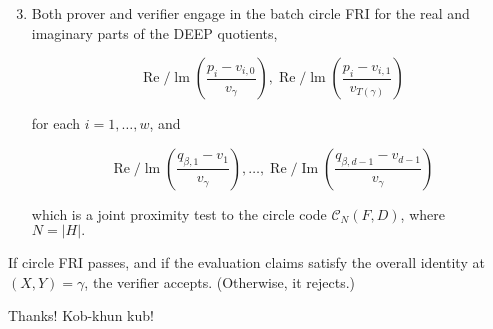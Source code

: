 \documentclass{beamer}
\begin{document}
\begin{frame}
	\frametitle{}
	\begin{enumerate}
	\setcounter{enumi}{2}
		\item Both prover and verifier engage in the batch circle FRI  for the real and imaginary parts of the DEEP quotients,

$$
\operatorname{Re} / \operatorname{lm}\left(\frac{p_i-v_{i, 0}}{v_\gamma}\right), \operatorname{Re} / \operatorname{lm}\left(\frac{p_i-v_{i, 1}}{v_{T(\gamma)}}\right)
$$

for each $i=1, \ldots, w$, and

$$
\operatorname{Re} / \operatorname{lm}\left(\frac{q_{\beta, 1}-v_1}{v_\gamma}\right), \ldots, \operatorname{Re} / \operatorname{Im}\left(\frac{q_{\beta, d-1}-v_{d-1}}{v_\gamma}\right)
$$

which is a joint proximity test to the circle code $\mathcal{C}_N(F, D)$, where $N=|H| . \quad$ 	\end{enumerate}
If circle FRI passes, and if the evaluation claims satisfy the overall identity at $(X, Y)=\gamma$, the verifier accepts. (Otherwise, it rejects.)
\end{frame}

\begin{frame}
	\centering \Large{Thanks! Kob-khun kub!}
\end{frame}
\end{document}

